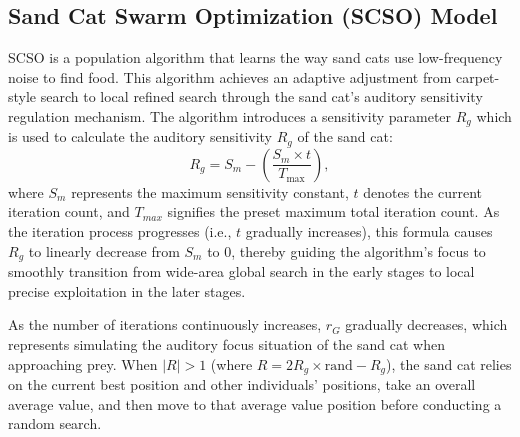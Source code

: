 \documentclass[conference]{{IEEEtran}}
\begin{document}
\subsection{Sand Cat Swarm Optimization (SCSO) Model}

SCSO \cite{li2025workspace} is a population algorithm that learns the way sand cats use low-frequency noise to find food. This algorithm achieves an adaptive adjustment from carpet-style search to local refined search through the sand cat's auditory sensitivity regulation mechanism. The algorithm introduces a sensitivity parameter $R_g$ which is used to calculate the auditory sensitivity
$R_g$ of the sand cat:\begin{equation}
    R_g = S_m - \left( \frac{S_m \times t}{T_{\max}} \right),
    \label{eq:scso_sensitivity}
\end{equation}
where $S_m$ represents the maximum sensitivity constant, $t$ denotes the current iteration count, and $T_{max}$ signifies the preset maximum total iteration count. As the iteration process progresses (i.e., $t$ gradually increases), this formula causes $R_g$ to linearly decrease from $S_m$ to 0, thereby guiding the algorithm's focus to smoothly transition from wide-area global search in the early stages to local precise exploitation in the later stages.

As the number of iterations continuously increases, $r_G$ gradually decreases, which represents simulating the auditory focus situation of the sand cat when approaching prey.  When $|R| > 1$ (where $R = 2R_g \times \text{rand} - R_g$), the sand cat relies on the current best position and other individuals' positions, take an overall average value, and then move to that average value position before conducting a random search.
    
\end{document}
